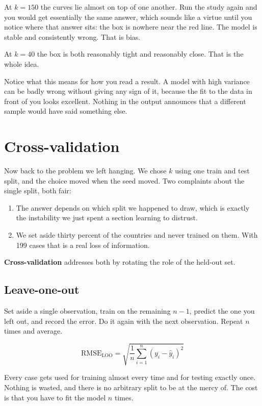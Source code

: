 \documentclass[
  a4paper,
]{scrbook}
\providecommand{\tightlist}{%
  \setlength{\itemsep}{0pt}\setlength{\parskip}{0pt}}
\begin{document}
At \(k=150\) the curves lie almost on top of one another. Run the study
again and you would get essentially the same answer, which sounds like a
virtue until you notice where that answer sits: the box is nowhere near
the red line. The model is stable and consistently wrong. That is bias.

At \(k=40\) the box is both reasonably tight and reasonably close. That
is the whole idea.

Notice what this means for how you read a result. A model with high
variance can be badly wrong without giving any sign of it, because the
fit to the data in front of you looks excellent. Nothing in the output
announces that a different sample would have said something else.

\chapter{Cross-validation}\label{cross-validation}

Now back to the problem we left hanging. We chose \(k\) using one train
and test split, and the choice moved when the seed moved. Two complaints
about the single split, both fair:

\begin{enumerate}
\def\labelenumi{\arabic{enumi}.}
\tightlist
\item
  The answer depends on which split we happened to draw, which is
  exactly the instability we just spent a section learning to distrust.
\item
  We set aside thirty percent of the countries and never trained on
  them. With 199 cases that is a real loss of information.
\end{enumerate}

\textbf{Cross-validation} addresses both by rotating the role of the
held-out set.

\section{Leave-one-out}\label{leave-one-out}

Set aside a single observation, train on the remaining \(n-1\), predict
the one you left out, and record the error. Do it again with the next
observation. Repeat \(n\) times and average.

\[\text{RMSE}_{\text{LOO}} = \sqrt{\frac{1}{n}\sum_{i=1}^{n}\left(y_i - \hat{y}_i\right)^2}\]

Every case gets used for training almost every time and for testing
exactly once. Nothing is wasted, and there is no arbitrary split to be
at the mercy of. The cost is that you have to fit the model \(n\) times.
\end{document}
